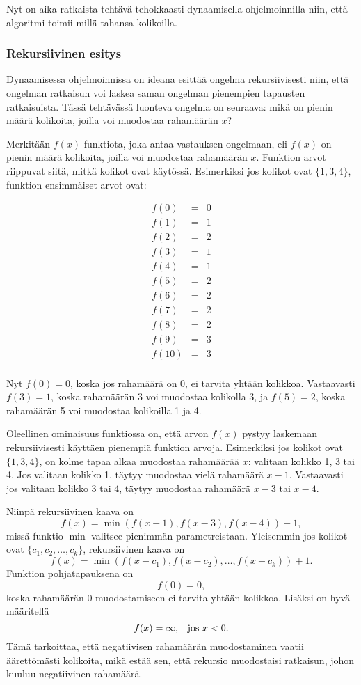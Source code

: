 Nyt on aika ratkaista tehtävä tehokkaasti
dynaamisella ohjelmoinnilla niin,
että algoritmi toimii millä tahansa kolikoilla.

\subsubsection{Rekursiivinen esitys}


Dynaamisessa ohjelmoinnissa on ideana esittää
ongelma rekursiivisesti niin,
että ongelman ratkaisun voi laskea
saman ongelman pienempien tapausten ratkaisuista.
Tässä tehtävässä luonteva ongelma on seuraava:
mikä on pienin määrä kolikoita,
joilla voi muodostaa rahamäärän $x$?

Merkitään $f(x)$ funktiota,
joka antaa vastauksen ongelmaan,
eli $f(x)$ on pienin määrä kolikoita,
joilla voi muodostaa rahamäärän $x$.
Funktion arvot riippuvat siitä,
mitkä kolikot ovat käytössä.
Esimerkiksi jos kolikot ovat $\{1,3,4\}$,
funktion ensimmäiset arvot ovat:

\[
\begin{array}{lcl}
f(0) & = & 0 \\
f(1) & = & 1 \\
f(2) & = & 2 \\
f(3) & = & 1 \\
f(4) & = & 1 \\
f(5) & = & 2 \\
f(6) & = & 2 \\
f(7) & = & 2 \\
f(8) & = & 2 \\
f(9) & = & 3 \\
f(10) & = & 3 \\
\end{array}
\]

Nyt $f(0)=0$, koska jos rahamäärä on 0,
ei tarvita yhtään kolikkoa.
Vastaavasti $f(3)=1$, koska rahamäärän 3
voi muodostaa kolikolla 3,
ja $f(5)=2$, koska rahamäärän 5
voi muodostaa kolikoilla 1 ja 4.

Oleellinen ominaisuus funktiossa on,
että arvon $f(x)$ pystyy laskemaan
rekursiivisesti käyttäen pienempiä
funktion arvoja.
Esimerkiksi jos kolikot ovat $\{1,3,4\}$,
on kolme tapaa alkaa muodostaa rahamäärää $x$:
valitaan kolikko 1, 3 tai 4.
Jos valitaan kolikko 1, täytyy
muodostaa vielä rahamäärä $x-1$.
Vastaavasti jos valitaan kolikko 3 tai 4,
täytyy muodostaa rahamäärä $x-3$ tai $x-4$.

Niinpä rekursiivinen kaava on
\[f(x) = \min(f(x-1),f(x-3),f(x-4))+1,\]
missä funktio $\min$ valitsee pienimmän parametreistaan.
Yleisemmin jos kolikot ovat $\{c_1,c_2,\ldots,c_k\}$,
rekursiivinen kaava on
\[f(x) = \min(f(x-c_1),f(x-c_2),\ldots,f(x-c_k))+1.\]
Funktion pohjatapauksena on
\[f(0)=0,\]
koska rahamäärän 0 muodostamiseen ei tarvita
yhtään kolikkoa.
Lisäksi on hyvä määritellä
\[f(x)=\infty,\hspace{8px}\textrm{jos $x<0$}.\]
Tämä tarkoittaa, että negatiivisen rahamäärän
muodostaminen vaatii äärettömästi kolikoita,
mikä estää sen, että rekursio muodostaisi
ratkaisun, johon kuuluu negatiivinen rahamäärä.

